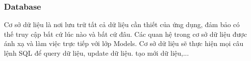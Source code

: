 \subsubsection{Database}
Cơ sở dữ liệu là nơi lưu trữ tất cả dữ liệu cần thiết của ứng dụng, đảm bảo có thế truy cập bất cứ lúc nào và bất cứ đâu. Các quan hệ trong cơ sở dữ liệu được ánh xạ và làm việc trực tiếp với lớp Models. Cơ sở dữ liệu sẽ thực hiện mọi câu lệnh SQL để query dữ liệu, update dữ liệu. tạo mới dữ liệu,...